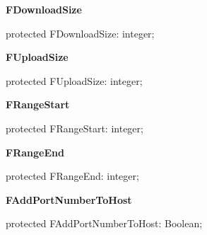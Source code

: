 \documentclass{report}
\newif\ifpdf
\begin{document}
\begin{list}{}
\par  \label{httpsend.THTTPSend-FDownloadSize}
\item[\textbf{FDownloadSize}\hfill]
\ifpdf
\begin{flushleft}
\fi
\begin{ttfamily}
protected FDownloadSize: integer;\end{ttfamily}

\ifpdf
\end{flushleft}
\fi


\par  \label{httpsend.THTTPSend-FUploadSize}
\item[\textbf{FUploadSize}\hfill]
\ifpdf
\begin{flushleft}
\fi
\begin{ttfamily}
protected FUploadSize: integer;\end{ttfamily}

\ifpdf
\end{flushleft}
\fi


\par  \label{httpsend.THTTPSend-FRangeStart}
\item[\textbf{FRangeStart}\hfill]
\ifpdf
\begin{flushleft}
\fi
\begin{ttfamily}
protected FRangeStart: integer;\end{ttfamily}

\ifpdf
\end{flushleft}
\fi


\par  \label{httpsend.THTTPSend-FRangeEnd}
\item[\textbf{FRangeEnd}\hfill]
\ifpdf
\begin{flushleft}
\fi
\begin{ttfamily}
protected FRangeEnd: integer;\end{ttfamily}

\ifpdf
\end{flushleft}
\fi


\par  \label{httpsend.THTTPSend-FAddPortNumberToHost}
\item[\textbf{FAddPortNumberToHost}\hfill]
\ifpdf
\begin{flushleft}
\fi
\begin{ttfamily}
protected FAddPortNumberToHost: Boolean;\end{ttfamily}

\ifpdf
\end{flushleft}
\fi


\par  \end{list}
\end{document}
